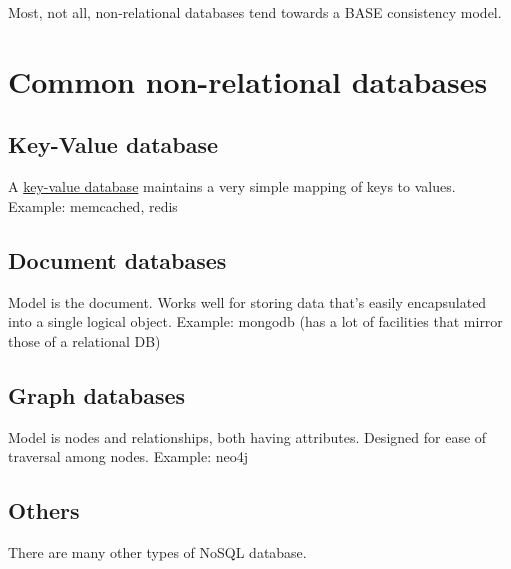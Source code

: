 \documentclass{pgnotes}
\begin{document}
Most, not all, non-relational databases tend towards a BASE consistency model. 

\section{Common non-relational databases}

\subsection{Key-Value database}

A \href{https://en.wikipedia.org/wiki/Key-value_database}{key-value database} maintains a very simple mapping of keys to values.
Example: memcached, redis

\subsection{Document databases}

Model is the document.
Works well for storing data that's easily encapsulated into a single logical object.
Example: mongodb (has a lot of facilities that mirror those of a relational DB)

\subsection{Graph databases}

Model is nodes and relationships, both having attributes.
Designed for ease of traversal among nodes.
Example: neo4j

\subsection{Others}

There are many other types of NoSQL database.



\end{document}
